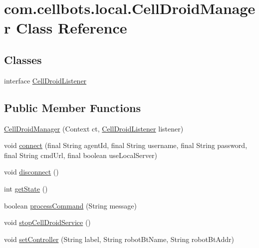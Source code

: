 \hypertarget{classcom_1_1cellbots_1_1local_1_1_cell_droid_manager}{\section{com.\-cellbots.\-local.\-Cell\-Droid\-Manager Class Reference}
\label{classcom_1_1cellbots_1_1local_1_1_cell_droid_manager}
}
\subsection*{Classes}
\begin{DoxyCompactItemize}
\item 
interface \hyperlink{interfacecom_1_1cellbots_1_1local_1_1_cell_droid_manager_1_1_cell_droid_listener}{Cell\-Droid\-Listener}
\end{DoxyCompactItemize}
\subsection*{Public Member Functions}
\begin{DoxyCompactItemize}
\item 
\hyperlink{classcom_1_1cellbots_1_1local_1_1_cell_droid_manager_a3b4ed887e409c833e3c620f38040feae}{Cell\-Droid\-Manager} (Context ct, \hyperlink{interfacecom_1_1cellbots_1_1local_1_1_cell_droid_manager_1_1_cell_droid_listener}{Cell\-Droid\-Listener} listener)
\item 
void \hyperlink{classcom_1_1cellbots_1_1local_1_1_cell_droid_manager_a627d0f6521e35b965d9cb96630c4c3c0}{connect} (final String agent\-Id, final String username, final String password, final String cmd\-Url, final boolean use\-Local\-Server)
\item 
void \hyperlink{classcom_1_1cellbots_1_1local_1_1_cell_droid_manager_aa43b2ca4f691db0a1f76461854a0e99c}{disconnect} ()
\item 
int \hyperlink{classcom_1_1cellbots_1_1local_1_1_cell_droid_manager_a1913d800fc8d3f38b4f8d3711fc41445}{get\-State} ()
\item 
boolean \hyperlink{classcom_1_1cellbots_1_1local_1_1_cell_droid_manager_aa8cd59275f9cb4ad490ca5d1f920014a}{process\-Command} (String message)
\item 
void \hyperlink{classcom_1_1cellbots_1_1local_1_1_cell_droid_manager_acc723c8ef016ae9d8103872f76227d4a}{stop\-Cell\-Droid\-Service} ()
\item 
void \hyperlink{classcom_1_1cellbots_1_1local_1_1_cell_droid_manager_a2c8a4fb8413cb7d59fa9dd6955a59da0}{set\-Controller} (String label, String robot\-Bt\-Name, String robot\-Bt\-Addr)
\end{DoxyCompactItemize}
